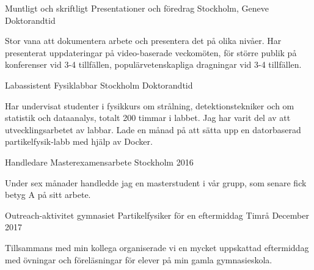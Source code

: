 



\begin{cventries}



\cventry
{Muntligt och skriftligt} %
{Presentationer och f{\"o}redrag} %
{Stockholm, Geneve} %
{Doktorandtid} %
{ %
\begin{cvitems}
\item {Stor vana att dokumentera arbete och presentera det p{\aa} olika niv{\aa}er. 
		Har presenterat uppdateringar p{\aa} video-baserade veckom{\"o}ten, f{\"o}r st{\"o}rre publik p{\aa} konferenser vid 3-4 tillf{\"a}llen, popul{\"a}rvetenskapliga dragningar vid 3-4 tillf{\"a}llen.}
\end{cvitems}
}



\cventry
{Labassistent} %
{Fysiklabbar} %
{Stockholm} %
{Doktorandtid} %
{ %
\begin{cvitems}
\item {Har undervisat studenter i fysikkurs om str{\aa}lning,  detektionstekniker och om statistik och dataanalys, totalt 200 timmar i labbet. Jag har varit del av att utvecklingsarbetet av labbar. Lade en m{\aa}nad p{\aa} att s{\"a}tta upp en datorbaserad partikelfysik-labb med hj{\"a}lp av Docker.}
\end{cvitems}
}



\cventry
{Handledare} %
{Masterexamensarbete} %
{Stockholm} %
{2016} %
{ %
\begin{cvitems}
\item {Under sex m{\aa}nader handledde jag en masterstudent i v{\aa}r grupp, som senare fick betyg A p{\aa} sitt arbete.}
\end{cvitems}
}



\cventry
{Outreach-aktivitet gymnasiet} %
{Partikelfysiker f{\"o}r en eftermiddag} %
{Timr\aa} %
{December 2017} %
{ %
\begin{cvitems}
\item {Tillsammans med min kollega organiserade vi en mycket uppskattad eftermiddag med {\"o}vningar och f{\"o}rel{\"a}sningar f{\"or} elever p{\aa} min gamla gymnasieskola.}
\end{cvitems}
}


\end{cventries}